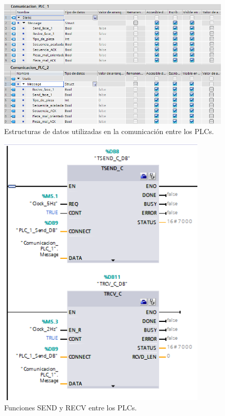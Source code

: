 \begin{figure} [h!]
  \begin{center}
    \includegraphics[width=16cm]{figs/estructura_com_plcs}
  \end{center}
  \caption{\centering Estructuras de datos utilizadas en la comunicación entre los PLCs.}
  \label{fig:estructura_com_plcs}
\end{figure} 

\clearpage

\begin{figure} [h!]
  \begin{center}
    \includegraphics[width=10cm]{figs/comunicacion_plcs}
  \end{center}
  \caption{\centering Funciones SEND y RECV entre los PLCs.}
  \label{fig:comunicacion_plcs}
\end{figure} 

